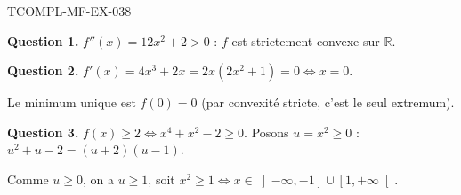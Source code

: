 \begin{corrige}{TCOMPL-MF-EX-038}

\textbf{Question 1.} $f''(x) = 12x^2 + 2 > 0$ : $f$ est strictement convexe sur $\mathbb{R}$.


\textbf{Question 2.} $f'(x) = 4x^3 + 2x = 2x(2x^2+1) = 0 \iff x = 0$.

Le minimum unique est $f(0) = 0$ (par convexité stricte, c'est le seul extremum).

\textbf{Question 3.} $f(x) \geq 2 \iff x^4 + x^2 - 2 \geq 0$. Posons $u = x^2 \geq 0$ : $u^2 + u - 2 = (u+2)(u-1)$.

Comme $u \geq 0$, on a $u \geq 1$, soit $x^2 \geq 1 \iff x \in \left]-\infty, -1\right] \cup \left[1, +\infty\right[$.

\end{corrige}
